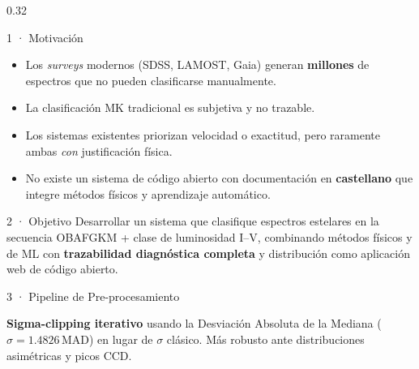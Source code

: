 \documentclass[final]{beamer}
\begin{document}
\begin{frame}[t]{}
\begin{columns}[t,totalwidth=\paperwidth]
\begin{column}{0.32\paperwidth}

  \begin{block}{1 · Motivación}
    \begin{itemize}\setlength\itemsep{6pt}
      \item Los \textit{surveys} modernos (SDSS, LAMOST, Gaia) generan
            \textbf{millones} de espectros que no pueden clasificarse manualmente.
      \item La clasificación MK tradicional es subjetiva y no trazable.
      \item Los sistemas existentes priorizan velocidad o exactitud,
            pero raramente ambas \emph{con} justificación física.
      \item No existe un sistema de código abierto con documentación en
            \textbf{castellano} que integre métodos físicos y aprendizaje
            automático.
    \end{itemize}
  \end{block}

  \vspace{0.5cm}

  \begin{alertblock}{2 · Objetivo}
    Desarrollar un sistema que clasifique espectros estelares en la secuencia
    OBAFGKM + clase de luminosidad I--V, combinando métodos físicos y de ML
    con \textbf{trazabilidad diagnóstica completa} y distribución como
    aplicación web de código abierto.
  \end{alertblock}

  \vspace{0.5cm}

  \begin{block}{3 · Pipeline de Pre-procesamiento}

    \begin{tcolorbox}[metodo={Paso 1 — Rechazo de rayos cósmicos (MAD)}]
      \textbf{Sigma-clipping iterativo} usando la Desviación Absoluta de la
      Mediana ($\hat\sigma = 1.4826\,\mathrm{MAD}$) en lugar de $\sigma$
      clásico. Más robusto ante distribuciones asimétricas y picos CCD.
    \end{tcolorbox}


\end{block}
\end{column}
\end{columns}
\end{frame}
\end{document}
